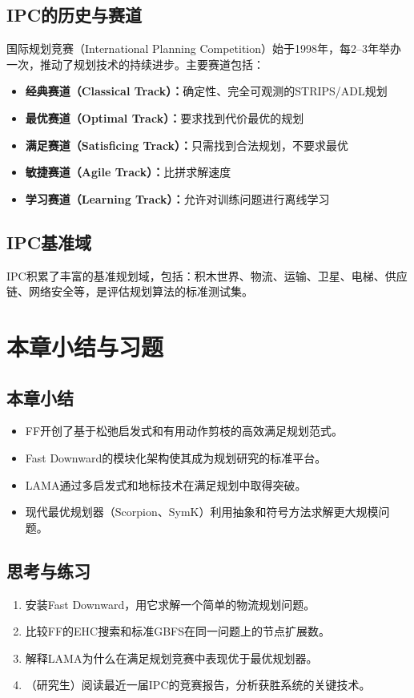 \subsection{IPC的历史与赛道}

国际规划竞赛（International Planning Competition）始于1998年，每2--3年举办一次，推动了规划技术的持续进步。主要赛道包括：
\begin{itemize}
  \item \textbf{经典赛道（Classical Track）：}确定性、完全可观测的STRIPS/ADL规划
  \item \textbf{最优赛道（Optimal Track）：}要求找到代价最优的规划
  \item \textbf{满足赛道（Satisficing Track）：}只需找到合法规划，不要求最优
  \item \textbf{敏捷赛道（Agile Track）：}比拼求解速度
  \item \textbf{学习赛道（Learning Track）：}允许对训练问题进行离线学习
\end{itemize}

\subsection{IPC基准域}

IPC积累了丰富的基准规划域，包括：积木世界、物流、运输、卫星、电梯、供应链、网络安全等，是评估规划算法的标准测试集。

\section{本章小结与习题}

\subsection*{本章小结}
\begin{itemize}
  \item FF开创了基于松弛启发式和有用动作剪枝的高效满足规划范式。
  \item Fast Downward的模块化架构使其成为规划研究的标准平台。
  \item LAMA通过多启发式和地标技术在满足规划中取得突破。
  \item 现代最优规划器（Scorpion、SymK）利用抽象和符号方法求解更大规模问题。
\end{itemize}

\subsection*{思考与练习}
\begin{enumerate}
  \item 安装Fast Downward，用它求解一个简单的物流规划问题。
  \item 比较FF的EHC搜索和标准GBFS在同一问题上的节点扩展数。
  \item 解释LAMA为什么在满足规划竞赛中表现优于最优规划器。
  \item （研究生）阅读最近一届IPC的竞赛报告，分析获胜系统的关键技术。
\end{enumerate}
